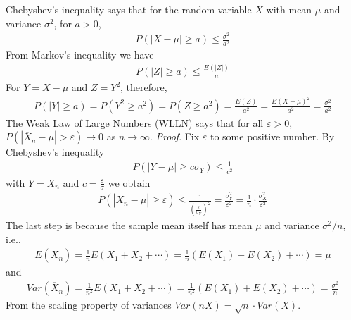 Chebyshev's inequality says that for the random variable \(X\) with mean
\(\mu\) and variance \(\sigma^{2}\), for \(a > 0\),
\begin{align}
P\left( |X - \mu| \geq a \right) \leq \frac{\sigma^{2}}{a^{2}}
\end{align}
From Markov's inequality we have
\begin{align}
P\left( |Z| \geq a \right) \leq \frac{E\left( |Z| \right)}{a}
\end{align}
For \(Y = X - \mu\) and \(Z = Y^{2}\), therefore,
\begin{align}
P\left( |Y| \geq a \right) = 
P\left( Y^{2} \geq a^{2} \right) = 
P\left( Z \geq a^{2} \right) = 
\frac{E(Z)}{a^{2}} = 
\frac{E(X - \mu)^{2}}{a^{2}} = 
\frac{\sigma^{2}}{a^{2}}
\end{align}
The Weak Law of Large Numbers (WLLN) says that for all \(\varepsilon > 0\),
\(P\left( \left| {\overline{X}}_{n} - \mu \right| > \varepsilon \right) \rightarrow 0\)
as \(n \rightarrow \infty\). 
\emph{Proof}. 
Fix \(\varepsilon\) to some positive number. 
By Chebyshev's inequality
\begin{align}
P\left( |Y - \mu| \geq c\sigma_{Y} \right) \leq \frac{1}{c^{2}}
\end{align}
with \(Y = {\overline{X}}_{n}\) and \(c = \frac{\varepsilon}{\sigma}\) we obtain
\begin{align}
P\left( \left| {\overline{X}}_{n} - \mu \right| \geq \varepsilon \right) \leq \frac{1}{\left( \frac{\varepsilon}{\sigma_{Y}} \right)^{2}} = 
\frac{\sigma_{Y}^{2}}{\varepsilon^{2}} = 
\frac{1}{n} \cdot \frac{\sigma_{X}^{2}}{\varepsilon^{2}}
\end{align}
The last step is because the sample mean itself has mean \(\mu\) and variance \(\sigma^{2}/n\), i.e.,
\begin{align}
E\left( {\overline{X}}_{n} \right) = 
\frac{1}{n}E\left( X_{1} + X_{2} + \cdots \right) = 
\frac{1}{n}\left( E\left( X_{1} \right) + E\left( X_{2} \right) + \cdots \right) = 
\mu
\end{align}
and
\begin{align}
Var\left( {\overline{X}}_{n} \right) = 
\frac{1}{n^{2}}E\left( X_{1} + X_{2} + \cdots \right) = 
\frac{1}{n^{2}}\left( E\left( X_{1} \right) + E\left( X_{2} \right) + \cdots \right) = 
\frac{\sigma^{2}}{n}
\end{align}
From the scaling property of variances
\(Var(nX) = \sqrt{n} \cdot Var(X)\).


